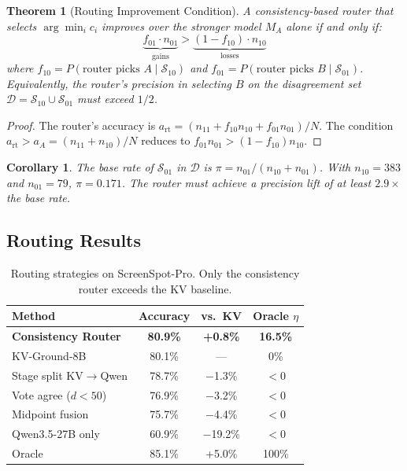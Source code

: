 \documentclass{article}
\newtheorem{theorem}{Theorem}
\newtheorem{corollary}{Corollary}
\begin{document}
\begin{theorem}[Routing Improvement Condition]\label{thm:routing}
A consistency-based router that selects $\arg\min_i c_i$ improves over the stronger model $M_A$ alone if and only if:
\begin{equation}
    \underbrace{f_{01} \cdot n_{01}}_{\text{gains}} > \underbrace{(1 - f_{10}) \cdot n_{10}}_{\text{losses}}
\end{equation}
where $f_{10} = P(\text{router picks } A \mid \mathcal{S}_{10})$ and $f_{01} = P(\text{router picks } B \mid \mathcal{S}_{01})$. Equivalently, the router's precision in selecting $B$ on the disagreement set $\mathcal{D} = \mathcal{S}_{10} \cup \mathcal{S}_{01}$ must exceed $1/2$.
\end{theorem}

\begin{proof}
The router's accuracy is $a_{\text{rt}} = (n_{11} + f_{10} n_{10} + f_{01} n_{01})/N$. The condition $a_{\text{rt}} > a_A = (n_{11} + n_{10})/N$ reduces to $f_{01} n_{01} > (1 - f_{10}) n_{10}$.
\end{proof}

\begin{corollary}
The base rate of $\mathcal{S}_{01}$ in $\mathcal{D}$ is $\pi = n_{01}/(n_{10} + n_{01})$. With $n_{10} = 383$ and $n_{01} = 79$, $\pi = 0.171$. The router must achieve a precision lift of at least $2.9\times$ the base rate.
\end{corollary}

\subsection{Routing Results}

\begin{table}[h]
\centering
\caption{Routing strategies on ScreenSpot-Pro. Only the consistency router exceeds the KV baseline.}
\label{tab:main}
\begin{tabular}{lccc}
\toprule
\textbf{Method} & \textbf{Accuracy} & \textbf{vs.\ KV} & \textbf{Oracle $\eta$} \\
\midrule
\textbf{Consistency Router} & \textbf{80.9\%} & \textbf{+0.8\%} & \textbf{16.5\%} \\
KV-Ground-8B & 80.1\% & --- & 0\% \\
Stage split KV$\to$Qwen & 78.7\% & $-$1.3\% & $< 0$ \\
Vote agree ($d{<}50$) & 76.9\% & $-$3.2\% & $< 0$ \\
Midpoint fusion & 75.7\% & $-$4.4\% & $< 0$ \\
Qwen3.5-27B only & 60.9\% & $-$19.2\% & $< 0$ \\
\midrule
Oracle & 85.1\% & +5.0\% & 100\% \\
\bottomrule
\end{tabular}
\end{table}
\end{document}
